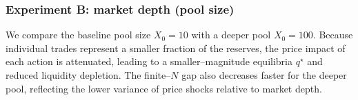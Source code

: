 \documentclass[11pt]{article}
\theoremstyle{definition}
\begin{document}



\subsubsection*{Experiment B: market depth (pool size)}

We compare the baseline pool size $X_0=10$ with a deeper pool $X_0 = 100$.  
Because individual trades represent a smaller fraction of the reserves,  
the price impact of each action is attenuated, leading to a 
smaller--magnitude equilibria $q^\star$ and reduced liquidity depletion.
The finite--$N$ gap also decreases faster for the deeper pool, reflecting 
the lower variance of price shocks relative to market depth.
\end{document}
